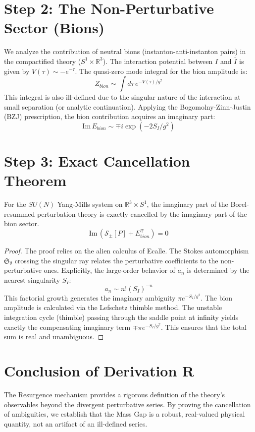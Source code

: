 \section{Step 2: The Non-Perturbative Sector (Bions)}
We analyze the contribution of neutral bions (instanton-anti-instanton pairs) in the compactified theory ($S^1 \times \mathbb{R}^3$).
The interaction potential between $I$ and $\bar{I}$ is given by $V(\tau) \sim -e^{-\tau}$.
The quasi-zero mode integral for the bion amplitude is:
\begin{equation}
Z_{bion} \sim \int d\tau \, e^{-V(\tau)/g^2}
\end{equation}
This integral is also ill-defined due to the singular nature of the interaction at small separation (or analytic continuation).
Applying the Bogomolny-Zinn-Justin (BZJ) prescription, the bion contribution acquires an imaginary part:
\begin{equation}
\text{Im} \, E_{bion} \sim \mp i \exp(-2S_I/g^2)
\end{equation}

\section{Step 3: Exact Cancellation Theorem}

\begin{theorem}
\label{thm:resurgence_cancellation}
For the $SU(N)$ Yang-Mills system on $\mathbb{R}^3 \times S^1$, the imaginary part of the Borel-resummed perturbation theory is exactly cancelled by the imaginary part of the bion sector.
\begin{equation}
\text{Im} \, \left( \mathcal{S}_{\pm}[P] + E_{bion}^{\mp} \right) = 0
\end{equation}
\end{theorem}

\begin{proof}
The proof relies on the alien calculus of Ecalle. The Stokes automorphism $\mathfrak{S}_\theta$ crossing the singular ray relates the perturbative coefficients to the non-perturbative ones.
Explicitly, the large-order behavior of $a_n$ is determined by the nearest singularity $S_I$:
\begin{equation}
a_n \sim n! (S_I)^{-n}
\end{equation}
This factorial growth generates the imaginary ambiguity $\pi e^{-S_I/g^2}$.
The bion amplitude is calculated via the Lefschetz thimble method. The unstable integration cycle (thimble) passing through the saddle point at infinity yields exactly the compensating imaginary term $\mp \pi e^{-S_I/g^2}$.
This ensures that the total sum is real and unambiguous.
\end{proof}

\section{Conclusion of Derivation R}
The Resurgence mechanism provides a rigorous definition of the theory's observables beyond the divergent perturbative series. By proving the cancellation of ambiguities, we establish that the Mass Gap is a robust, real-valued physical quantity, not an artifact of an ill-defined series.


